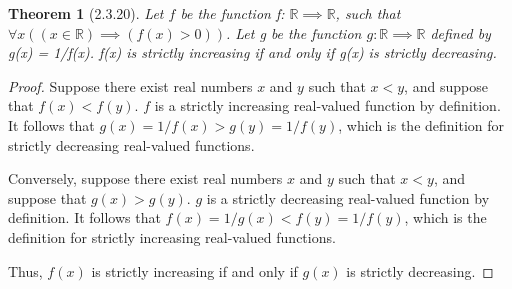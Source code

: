 \documentclass[a4paper, 12pt]{article}
\theoremstyle{plain}
\newtheorem*{theorem*}{Theorem}
\begin{document}
	
	\begin{theorem*}[2.3.20]
		Let $f$ be the function f: $\mathbb{R} \implies \mathbb{R}$, such that \newline $\forall x ((x \in \mathbb{R}) \implies (f(x) > 0))$. Let g be the function $g: \mathbb{R} \implies \mathbb{R}$ defined by g(x) = 1/f(x). f(x) is strictly increasing if and only if g(x) is strictly decreasing.
	\end{theorem*}
	
	\begin{proof}
		Suppose there exist real numbers $x$ and $y$ such that $x < y$, and suppose that $f(x) < f(y)$. $f$ is a strictly increasing real-valued function by definition. It follows that $g(x) = 1/f(x) > g(y) = 1/f(y)$, which is the definition for strictly decreasing real-valued functions.
		
		Conversely, suppose there exist real numbers $x$ and $y$ such that $x < y$, and suppose that $g(x) > g(y)$. $g$ is a strictly decreasing real-valued function by definition. It follows that $f(x) = 1/g(x) < f(y) = 1/f(y)$, which is the definition for strictly increasing real-valued functions.
		
		Thus, $f(x)$ is strictly increasing if and only if $g(x)$ is strictly decreasing.
	\end{proof}
\end{document}
